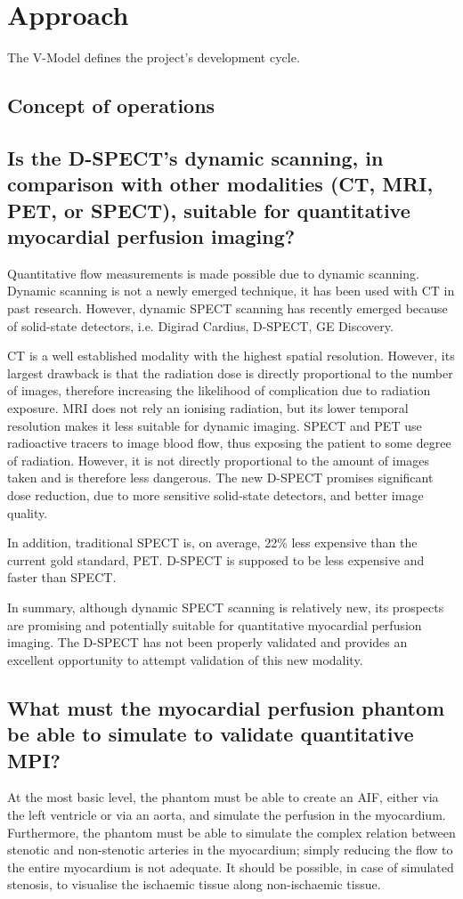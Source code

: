\section{Approach}
The V-Model defines the project's development cycle. 

\subsection{Concept of operations}
\subsection*{Is the D-SPECT's dynamic scanning, in comparison with other modalities (CT, MRI, PET, or SPECT), suitable for quantitative myocardial perfusion imaging?}
Quantitative flow measurements is made possible due to dynamic scanning. Dynamic scanning is not a newly emerged technique, it has been used with \ac{CT} in past research. However, dynamic \ac{SPECT} scanning has recently emerged because of solid-state detectors, i.e. Digirad Cardius, D-SPECT, GE Discovery.

\ac{CT} is a well established modality with the highest spatial resolution. However, its largest drawback is that the radiation dose is directly proportional to the number of images, therefore increasing the likelihood of complication due to radiation exposure. \ac{MRI} does not rely an ionising radiation, but its lower temporal resolution makes it less suitable for dynamic imaging. \ac{SPECT} and \ac{PET} use radioactive tracers to image blood flow, thus exposing the patient to some degree of radiation. However, it is not directly proportional to the amount of images taken and is therefore less dangerous. The new D-SPECT promises significant dose reduction, due to more sensitive solid-state detectors, and better image quality.

In addition, traditional \ac{SPECT} is, on average, 22\% less expensive than the current gold standard, \ac{PET}. D-SPECT is supposed to be less expensive and faster than \ac{SPECT}.

In summary, although dynamic \ac{SPECT} scanning is relatively new, its prospects are promising and potentially suitable for quantitative myocardial perfusion imaging. The D-SPECT has not been properly validated and provides an excellent opportunity to attempt validation of this new modality.

\subsection{What must the myocardial perfusion phantom be able to simulate to validate quantitative MPI?}
At the most basic level, the phantom must be able to create an \ac{AIF}, either via the left ventricle or via an aorta, and simulate the perfusion in the myocardium. Furthermore, the phantom must be able to simulate the complex relation between stenotic and non-stenotic arteries in the myocardium; simply reducing the flow to the entire myocardium is not adequate. It should be possible, in case of simulated stenosis, to visualise the ischaemic tissue along non-ischaemic tissue.


